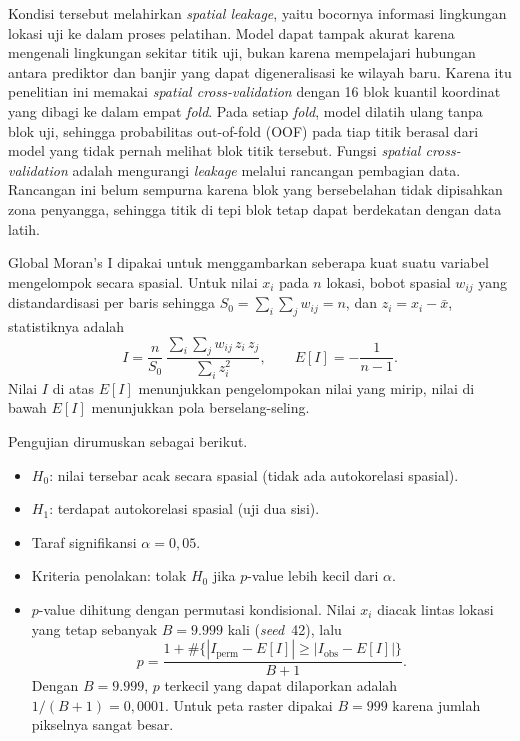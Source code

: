 \documentclass[12pt,a4paper]{article}
\begin{document}
Kondisi tersebut melahirkan \textit{spatial leakage}, yaitu bocornya
informasi lingkungan lokasi uji ke dalam proses pelatihan. Model dapat tampak
akurat karena mengenali lingkungan sekitar titik uji, bukan karena
mempelajari hubungan antara prediktor dan banjir yang dapat digeneralisasi ke
wilayah baru. Karena itu penelitian ini memakai \textit{spatial
cross-validation} dengan 16 blok kuantil koordinat yang dibagi ke dalam empat
\textit{fold}. Pada setiap \textit{fold}, model dilatih ulang tanpa blok uji,
sehingga probabilitas out-of-fold (OOF) pada tiap titik berasal dari model
yang tidak pernah melihat blok titik tersebut. Fungsi \textit{spatial
cross-validation} adalah mengurangi \textit{leakage} melalui rancangan
pembagian data. Rancangan ini belum sempurna karena blok yang bersebelahan
tidak dipisahkan zona penyangga, sehingga titik di tepi blok tetap dapat
berdekatan dengan data latih.

Global Moran's I \citep{moran1950} dipakai untuk menggambarkan seberapa kuat
suatu variabel mengelompok secara spasial. Untuk nilai $x_i$ pada $n$ lokasi,
bobot spasial $w_{ij}$ yang distandardisasi per baris sehingga
$S_0=\sum_{i}\sum_{j}w_{ij}=n$, dan $z_i=x_i-\bar{x}$, statistiknya adalah
\[
I=\frac{n}{S_0}\,\frac{\sum_{i}\sum_{j}w_{ij}\,z_i\,z_j}{\sum_{i}z_i^{2}},
\qquad E[I]=-\frac{1}{n-1}.
\]
Nilai $I$ di atas $E[I]$ menunjukkan pengelompokan nilai yang mirip, nilai di
bawah $E[I]$ menunjukkan pola berselang-seling.

Pengujian dirumuskan sebagai berikut.
\begin{itemize}
\item $H_0$: nilai tersebar acak secara spasial (tidak ada autokorelasi
      spasial).
\item $H_1$: terdapat autokorelasi spasial (uji dua sisi).
\item Taraf signifikansi $\alpha=0{,}05$.
\item Kriteria penolakan: tolak $H_0$ jika $p$-value lebih kecil dari
      $\alpha$.
\item $p$-value dihitung dengan permutasi kondisional. Nilai $x_i$ diacak
      lintas lokasi yang tetap sebanyak $B=9.999$ kali (\textit{seed}~42),
      lalu
      \[
      p=\frac{1+\#\{|I_{\mathrm{perm}}-E[I]|\ge
      |I_{\mathrm{obs}}-E[I]|\}}{B+1}.
      \]
      Dengan $B=9.999$, $p$ terkecil yang dapat dilaporkan adalah
      $1/(B+1)=0{,}0001$. Untuk peta raster dipakai $B=999$ karena jumlah
      pikselnya sangat besar.
\end{itemize}
\end{document}
